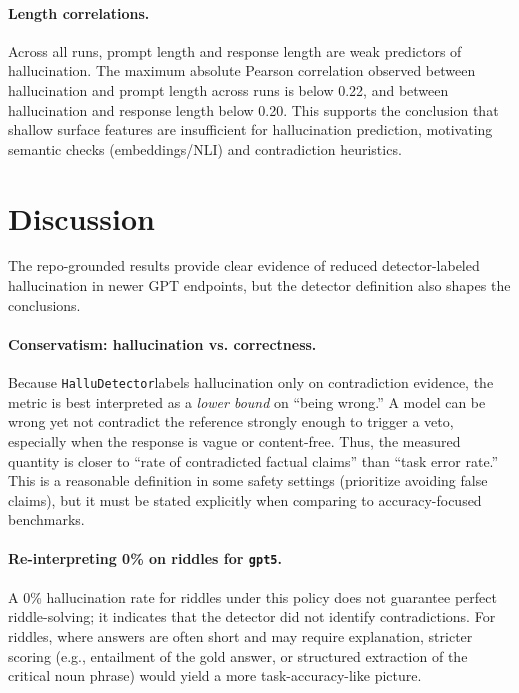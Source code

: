 \documentclass[11pt]{article}
\newcommand{\model}[1]{\texttt{#1}}
\newcommand{\dataset}{\texttt{HalluDetector}}
\begin{document}
\paragraph{Length correlations.}
Across all runs, prompt length and response length are weak predictors of hallucination. The maximum absolute Pearson correlation observed between hallucination and prompt length across runs is below 0.22, and between hallucination and response length below 0.20. This supports the conclusion that shallow surface features are insufficient for hallucination prediction, motivating semantic checks (embeddings/NLI) and contradiction heuristics.

\section{Discussion}
The repo-grounded results provide clear evidence of reduced detector-labeled hallucination in newer GPT endpoints, but the detector definition also shapes the conclusions.

\paragraph{Conservatism: hallucination vs. correctness.}
Because \dataset labels hallucination only on contradiction evidence, the metric is best interpreted as a \emph{lower bound} on ``being wrong.'' A model can be wrong yet not contradict the reference strongly enough to trigger a veto, especially when the response is vague or content-free. Thus, the measured quantity is closer to ``rate of contradicted factual claims'' than ``task error rate.'' This is a reasonable definition in some safety settings (prioritize avoiding false claims), but it must be stated explicitly when comparing to accuracy-focused benchmarks.

\paragraph{Re-interpreting 0\% on riddles for \model{gpt5}.}
A 0\% hallucination rate for riddles under this policy does not guarantee perfect riddle-solving; it indicates that the detector did not identify contradictions. For riddles, where answers are often short and may require explanation, stricter scoring (e.g., entailment of the gold answer, or structured extraction of the critical noun phrase) would yield a more task-accuracy-like picture.
\end{document}
